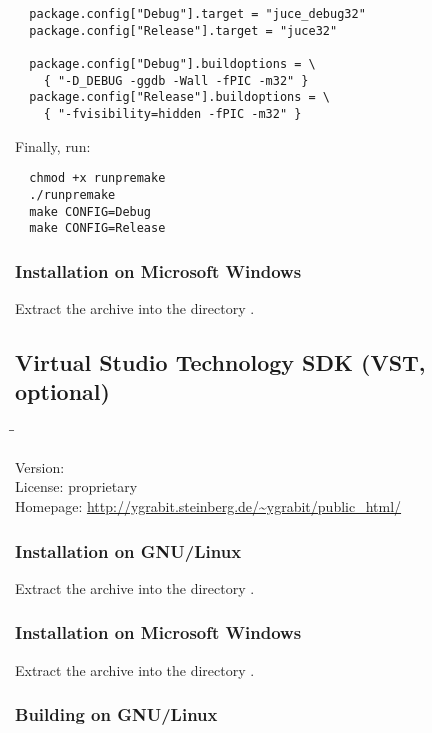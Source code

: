 \begin{verbatim}
  package.config["Debug"].target = "juce_debug32"
  package.config["Release"].target = "juce32"

  package.config["Debug"].buildoptions = \
    { "-D_DEBUG -ggdb -Wall -fPIC -m32" }
  package.config["Release"].buildoptions = \
    { "-fvisibility=hidden -fPIC -m32" }
\end{verbatim}

Finally, run:

\begin{verbatim}
  chmod +x runpremake
  ./runpremake
  make CONFIG=Debug
  make CONFIG=Release
\end{verbatim}

\subsubsection{Installation on Microsoft Windows}

Extract the archive into the directory .

\subsection{Virtual Studio Technology SDK (VST, optional)}

\begin{tabbing}
  \hspace*{6em}\=\=\kill

  Version:   \\
  License:  \> proprietary \\
  Homepage: \> \url{http://ygrabit.steinberg.de/~ygrabit/public_html/}
\end{tabbing}

\subsubsection{Installation on GNU/Linux}

Extract the archive into the directory .

\subsubsection{Installation on Microsoft Windows}

Extract the archive into the directory .

\subsubsection{Building on GNU/Linux}

